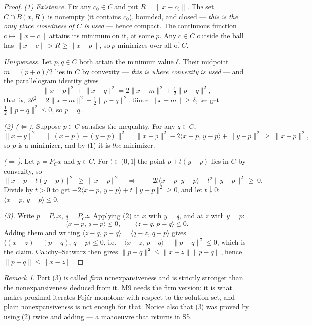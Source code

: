 \documentclass[11pt,a4paper]{article}
\theoremstyle{definition}
\theoremstyle{plain}
\theoremstyle{remark}
\newtheorem*{remark}{Remark}
\newcommand{\ip}[2]{\langle #1,\, #2\rangle}
\newcommand{\norm}[1]{\lVert #1\rVert}
\newcommand{\proj}{P}
\begin{document}
\begin{proof}
\emph{(1) Existence.} Fix any $c_0\in C$ and put $R=\norm{x-c_0}$. The set
$C\cap\bar B(x,R)$ is nonempty (it contains $c_0$), bounded, and closed --- \emph{this is the
only place closedness of $C$ is used} --- hence compact. The continuous function
$c\mapsto\norm{x-c}$ attains its minimum on it, at some $p$. Any $c\in C$ outside the ball has
$\norm{x-c}>R\ge\norm{x-p}$, so $p$ minimizes over all of $C$.

\emph{Uniqueness.} Let $p,q\in C$ both attain the minimum value $\delta$. Their midpoint
$m=(p+q)/2$ lies in $C$ by convexity --- \emph{this is where convexity is used} --- and the
parallelogram identity gives
\[
\norm{x-p}^2+\norm{x-q}^2=2\norm{x-m}^2+\tfrac12\norm{p-q}^2 ,
\]
that is, $2\delta^2=2\norm{x-m}^2+\tfrac12\norm{p-q}^2$. Since $\norm{x-m}\ge\delta$, we get
$\tfrac12\norm{p-q}^2\le0$, so $p=q$.

\emph{(2) ($\Leftarrow$).} Suppose $p\in C$ satisfies the inequality. For any $y\in C$,
\[
\norm{x-y}^2=\norm{(x-p)-(y-p)}^2=\norm{x-p}^2-2\ip{x-p}{y-p}+\norm{y-p}^2\ \ge\ \norm{x-p}^2 ,
\]
so $p$ is a minimizer, and by (1) it is \emph{the} minimizer.

\emph{($\Rightarrow$).} Let $p=\proj_Cx$ and $y\in C$. For $t\in(0,1]$ the point $p+t(y-p)$ lies
in $C$ by convexity, so
\[
\norm{x-p-t(y-p)}^2\ \ge\ \norm{x-p}^2
\quad\Longrightarrow\quad
-2t\ip{x-p}{y-p}+t^2\norm{y-p}^2\ \ge\ 0 .
\]
Divide by $t>0$ to get $-2\ip{x-p}{y-p}+t\norm{y-p}^2\ge0$, and let $t\downarrow0$:
$\ip{x-p}{y-p}\le0$.

\emph{(3).} Write $p=\proj_Cx$, $q=\proj_Cz$. Applying (2) at $x$ with $y=q$, and at $z$ with
$y=p$:
\[
\ip{x-p}{q-p}\le0,\qquad \ip{z-q}{p-q}\le0 .
\]
Adding them and writing $\ip{z-q}{p-q}=\ip{q-z}{q-p}$ gives $\ip{(x-z)-(p-q)}{q-p}\le0$, i.e.
$-\ip{x-z}{p-q}+\norm{p-q}^2\le0$, which is the claim. Cauchy--Schwarz then gives
$\norm{p-q}^2\le\norm{x-z}\norm{p-q}$, hence $\norm{p-q}\le\norm{x-z}$.
\end{proof}

\begin{remark}
Part (3) is called \emph{firm} nonexpansiveness and is strictly stronger than the
nonexpansiveness deduced from it. M9 needs the firm version: it is what makes proximal iterates
Fej\'er monotone with respect to the solution set, and plain nonexpansiveness is not enough for
that. Notice also that (3) was proved by using (2) twice and adding --- a manoeuvre that returns
in S5.
\end{remark}
\end{document}

